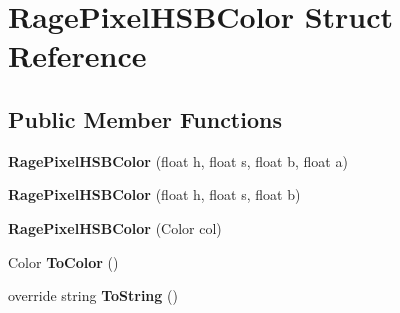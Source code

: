 \hypertarget{struct_rage_pixel_h_s_b_color}{\section{Rage\-Pixel\-H\-S\-B\-Color Struct Reference}
\label{struct_rage_pixel_h_s_b_color}
}
\subsection*{Public Member Functions}
\begin{DoxyCompactItemize}
\item 
\hypertarget{struct_rage_pixel_h_s_b_color_a613fe57ed85436a39de403aa07b83d55}{{\bfseries Rage\-Pixel\-H\-S\-B\-Color} (float h, float s, float b, float a)}\label{struct_rage_pixel_h_s_b_color_a613fe57ed85436a39de403aa07b83d55}

\item 
\hypertarget{struct_rage_pixel_h_s_b_color_abd4a8f1504538786d7283c29dd2b8529}{{\bfseries Rage\-Pixel\-H\-S\-B\-Color} (float h, float s, float b)}\label{struct_rage_pixel_h_s_b_color_abd4a8f1504538786d7283c29dd2b8529}

\item 
\hypertarget{struct_rage_pixel_h_s_b_color_a3c3ab0e65202dcb632ea4cd6df0c6473}{{\bfseries Rage\-Pixel\-H\-S\-B\-Color} (Color col)}\label{struct_rage_pixel_h_s_b_color_a3c3ab0e65202dcb632ea4cd6df0c6473}

\item 
\hypertarget{struct_rage_pixel_h_s_b_color_a1009246655e4a0e59f72ebb811269582}{Color {\bfseries To\-Color} ()}\label{struct_rage_pixel_h_s_b_color_a1009246655e4a0e59f72ebb811269582}

\item 
\hypertarget{struct_rage_pixel_h_s_b_color_a076f2df81279b455dc5d5b69983dc4bb}{override string {\bfseries To\-String} ()}\label{struct_rage_pixel_h_s_b_color_a076f2df81279b455dc5d5b69983dc4bb}

\end{DoxyCompactItemize}
